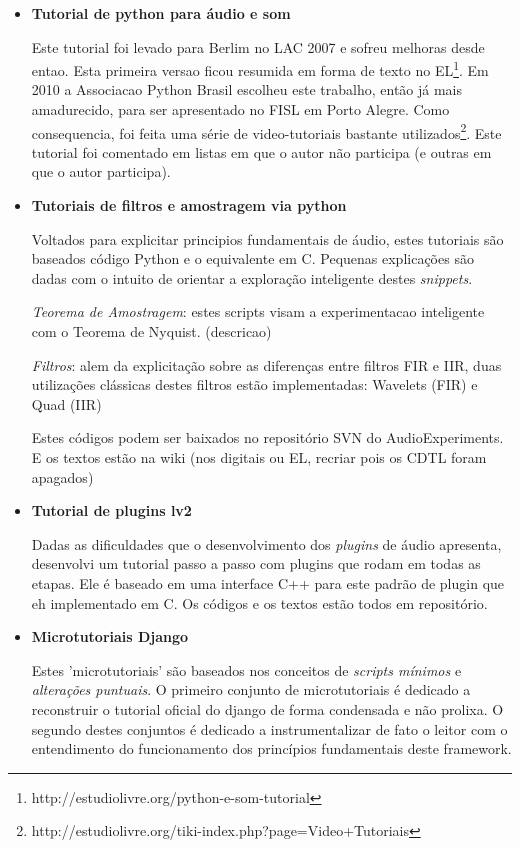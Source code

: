 \begin{itemize}
    \item {\bf Tutorial de python para áudio e som}

Este tutorial foi levado para Berlim no LAC 2007 e sofreu melhoras desde entao. Esta
primeira versao ficou resumida em forma de texto no EL\footnote{http://estudiolivre.org/python-e-som-tutorial}. Em 2010
a Associacao Python Brasil escolheu este trabalho, então já mais amadurecido, para ser apresentado no
FISL em Porto Alegre. Como consequencia, foi feita uma série de video-tutoriais bastante utilizados\footnote{http://estudiolivre.org/tiki-index.php?page=Video+Tutoriais}.
Este tutorial foi comentado em listas em que o autor não participa (e outras em que o autor participa).

    \item {\bf Tutoriais de filtros e amostragem via python}

Voltados para explicitar principios fundamentais de áudio, estes tutoriais
são baseados código Python e o equivalente em C. Pequenas explicações são
dadas com o intuito de orientar a exploração inteligente destes \emph{snippets}.

\emph{Teorema de Amostragem}: estes scripts visam a experimentacao inteligente com
o Teorema de Nyquist. (descricao)

\emph{Filtros}: alem da explicitação sobre as diferenças entre filtros FIR e IIR,
duas utilizações clássicas destes filtros estão implementadas: Wavelets (FIR) e Quad (IIR)

Estes códigos podem ser baixados no repositório SVN do AudioExperiments. E os textos estão
na wiki (nos digitais ou EL, recriar pois os CDTL foram apagados)

    \item {\bf Tutorial de plugins lv2}

Dadas as dificuldades que o desenvolvimento dos \emph{plugins} de áudio apresenta,
desenvolvi um tutorial passo a passo com plugins que rodam em todas as etapas.
Ele é baseado em uma interface C++ para este padrão de plugin que eh implementado
em C. Os códigos e os textos estão todos em repositório.

    \item {\bf Microtutoriais Django ~\cite{dmicrotuts}}

Estes 'microtutoriais' são baseados nos conceitos de \emph{scripts mínimos} e
\emph{alterações puntuais}. O primeiro conjunto de microtutoriais é dedicado
a reconstruir o tutorial oficial do django de forma condensada e não prolixa.
O segundo destes conjuntos é dedicado a instrumentalizar de fato o leitor com
o entendimento do funcionamento dos princípios fundamentais deste framework.


\end{itemize}

